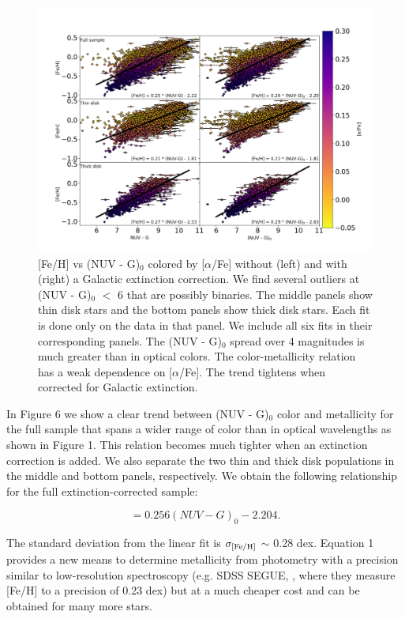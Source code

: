 \documentclass[twocolumn]{emulateapj}
\begin{document}
\begin{figure}[]
\centering
\includegraphics[width=1\textwidth]{f6.pdf}
\caption{[Fe/H] vs (NUV - G)$_0$ colored by [$\alpha$/Fe] without (left) and with (right) a Galactic extinction correction. We find several outliers at (NUV - G)$_0$ $<$ 6 that are possibly binaries. The middle panels show thin disk stars and the bottom panels show thick disk stars. Each fit is done only on the data in that panel. We include all six fits in their corresponding panels. The (NUV - G)$_0$ spread over 4 magnitudes is much greater than in optical colors. The color-metallicity relation has a weak dependence on [$\alpha$/Fe]. The trend tightens when corrected for Galactic extinction.}
\end{figure}

In Figure 6 we show a clear trend between (NUV - G)$_0$ color and metallicity for the full sample that spans a wider range of color than in optical wavelengths as shown in Figure 1. This relation becomes much tighter when an extinction correction is added. We also separate the two thin and thick disk populations in the middle and bottom panels, respectively. We obtain the following relationship for the full extinction-corrected sample:

\begin{equation}
    [Fe/H] = 0.256 (NUV - G)_0 - 2.204.
\end{equation}

The standard deviation from the linear fit is $\sigma_{\rm{[Fe/H]}}$ $\sim$ 0.28 dex. Equation 1 provides a new means to determine metallicity from photometry with a precision similar to low-resolution spectroscopy (e.g. SDSS SEGUE, \citealt{lee2011}, where they measure [Fe/H] to a precision of 0.23 dex) but at a much cheaper cost and can be obtained for many more stars. 
\end{document}
